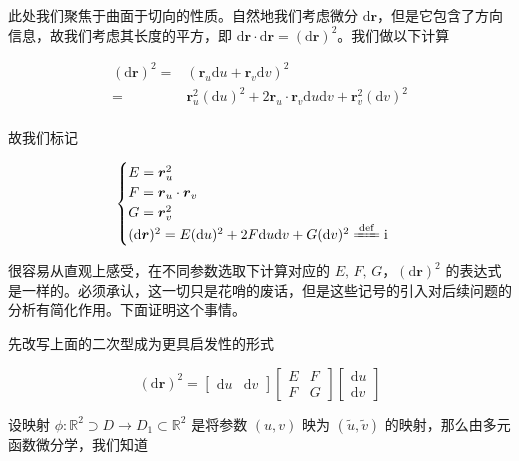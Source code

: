 \documentclass[a4paper, 12pt]{article}
\begin{document}
    此处我们聚焦于曲面于切向的性质。自然地我们考虑微分 $\mathrm d\boldsymbol r$，但是它包含了方向信息，故我们考虑其长度的平方，即 $\mathrm d\boldsymbol r \cdot \mathrm d\boldsymbol r=(\mathrm d\boldsymbol r)^2$。我们做以下计算

    \[
    \begin{aligned}
        (\mathrm d\boldsymbol r)^2 = & (\boldsymbol r_u\mathrm du+\boldsymbol r_v\mathrm dv)^2\\
        = & \boldsymbol r_u^2 (\mathrm du)^2 + 2\boldsymbol r_u \cdot \boldsymbol r_v \mathrm du \mathrm dv + \boldsymbol r_v^2 (\mathrm dv)^2\\
    \end{aligned}
    \]

    故我们标记

    \begin{equation}
    \begin{cases}
        E=\boldsymbol r_u^2 \\
        F=\boldsymbol r_u\cdot \boldsymbol r_v \\
        G=\boldsymbol r_v^2\\
        (\mathrm d\boldsymbol r)^2 = E(\mathrm du)^2+2F\mathrm du\mathrm dv+G(\mathrm dv)^2 \xlongequal{\mathrm{def}}\text{\uppercase\expandafter{\romannumeral 1}}
    \end{cases}
    \end{equation}

    很容易从直观上感受，在不同参数选取下计算对应的 $E,\,F,\,G$，$(\mathrm d\boldsymbol r)^2$ 的表达式是一样的。必须承认，这一切只是花哨的废话，但是这些记号的引入对后续问题的分析有简化作用。下面证明这个事情。

    先改写上面的二次型成为更具启发性的形式

    \begin{equation}
        (\mathrm d\boldsymbol r)^2=
        \begin{bmatrix}
        \mathrm du & \mathrm dv
        \end{bmatrix}
        \begin{bmatrix}
        E&F\\
        F&G
        \end{bmatrix}
        \begin{bmatrix}
        \mathrm du\\
        \mathrm dv
        \end{bmatrix}
    \end{equation}

    设映射 $\phi: \mathbb R^2\supset D\to D_1\subset \mathbb R^2$ 是将参数 $(u,v)$ 映为 $(\tilde u,\tilde v)$ 的映射，那么由多元函数微分学，我们知道
\end{document}
